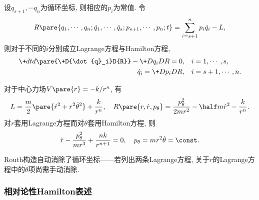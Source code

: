 \documentclass[../TheoreticalMechanics.tex]{subfiles}
\begin{document}
\begin{theorem}[Routh构造]
    设$q_{s+1}, \cdots q_n$为循环坐标, 则相应的$p_i$为常值. 令
    \begin{equation*}
        R\pare{q_1,\cdots,q_n;\dot{q}_1,\cdots,\dot{q}_s;p_{s+1},\cdots,p_n;t}  = \sum_{i = s+1}^n p_i\dot{q}_i - L,
    \end{equation*}
    则对于不同的$i$分别成立Lagrange方程与Hamilton方程,
    \begin{align*}
        \+dtd{}\pare{\+D{\dot{q}_i}D{R}} - \+D{q_i}D{R} = 0,&\quad i = 1,\cdots,s,\\
        \dot{q}_i = \+D{p_i}D{R},&\quad i = s+1,\cdots, n.
    \end{align*}
\end{theorem}
\begin{ex}
    对于中心力场$V\pare{r} = -k/r^n$, 有
    \[ L = \frac{m}{2}\pare{\dot{r}^2 + r^2\dot{\theta}^2} + \frac{k}{r^n},\quad R\pare{r,\dot{r},p_\theta} = \frac{p_\theta^2}{2mr^2} - \half m\dot{r}^2 -\frac{k}{r^n}. \]
    对$r$套用Lagrange方程而对$\theta$套用Hamilton方程, 则
    \[ \ddot{r} - \frac{p_\theta^2}{mr^3} + \frac{nk}{r^{n+1}} = 0,\quad p_\theta = mr^2\dot{\theta} = \const. \]
\end{ex}
\begin{remark}
    Routh构造自动消除了循环坐标——若列出两条Lagrange方程, 关于$r$的Lagrange方程中的$\dot{\theta}$项尚需手动消除.
\end{remark}


\subsubsection{相对论性Hamilton表述} %
\label{ssub:相对论性hamilton表述}
\end{document}
